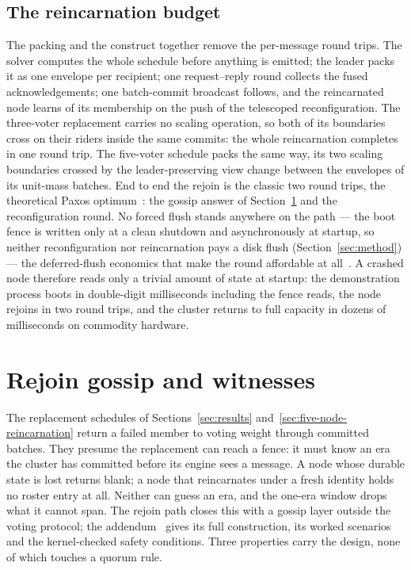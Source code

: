 \documentclass[10pt,journal,letterpaper]{IEEEtran}
\begin{document}
\subsection{The reincarnation budget}
The packing and the construct together remove the per-message round trips. The solver computes the whole schedule before anything is emitted; the leader packs it as one envelope per recipient; one request--reply round collects the fused acknowledgements; one batch-commit broadcast follows, and the reincarnated node learns of its membership on the push of the telescoped reconfiguration. The three-voter replacement carries no scaling operation, so both of its boundaries cross on their riders inside the same commits: the whole reincarnation completes in one round trip. The five-voter schedule packs the same way, its two scaling boundaries crossed by the leader-preserving view change between the envelopes of its unit-mass batches. End to end the rejoin is the classic two round trips, the theoretical Paxos optimum~\cite{pms}: the gossip answer of Section~\ref{sec:rejoin-gossip} and the reconfiguration round. No forced flush stands anywhere on the path --- the boot fence is written only at a clean shutdown and asynchronously at startup, so neither reconfiguration nor reincarnation pays a disk flush (Section~\ref{sec:method}) --- the deferred-flush economics that make the round affordable at all~\cite{netdisk}. A crashed node therefore reads only a trivial amount of state at startup: the demonstration process boots in double-digit milliseconds including the fence reads, the node rejoins in two round trips, and the cluster returns to full capacity in dozens of milliseconds on commodity hardware.

\section{Rejoin gossip and witnesses}\label{sec:rejoin-gossip}
The replacement schedules of Sections~\ref{sec:results}
and~\ref{sec:five-node-reincarnation} return a failed member to voting
weight through committed batches. They presume the replacement can reach a
fence: it must know an era the cluster has committed before its engine sees
a message. A node whose durable state is lost returns blank; a node that
reincarnates under a fresh identity holds no roster entry at all. Neither
can guess an era, and the one-era window drops what it cannot
span. The rejoin path closes this with a gossip layer outside the voting
protocol; the addendum~\cite{artifact} gives its full construction, its
worked scenarios and the kernel-checked safety conditions. Three properties
carry the design, none of which touches a quorum rule.
\end{document}
